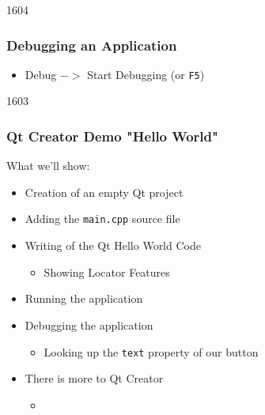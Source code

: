 \begin{slide}{1604}
  \frametitle{Debugging an Application}
  \begin{itemize}
  \item Debug $->$ Start Debugging (or \texttt{F5})
  \end{itemize}
\end{slide}

\begin{slide}{1603}
  \frametitle{Qt Creator Demo "Hello World"}
  What we'll show:
  \begin{itemize}
  \item Creation of an empty Qt project
  \item Adding the \texttt{main.cpp} source file
  \item Writing of the Qt Hello World Code
    \begin{itemize}
    \item Showing Locator Features
    \end{itemize}
  \item Running the application
  \item Debugging the application
    \begin{itemize}
    \item Looking up the \texttt{text} property of our button
    \end{itemize}
  \end{itemize}
  \medskip
  \begin{itemize}
  \item There is more to Qt Creator
    \begin{itemize}
    \item[] 
    \end{itemize}
  \end{itemize}
\end{slide}
